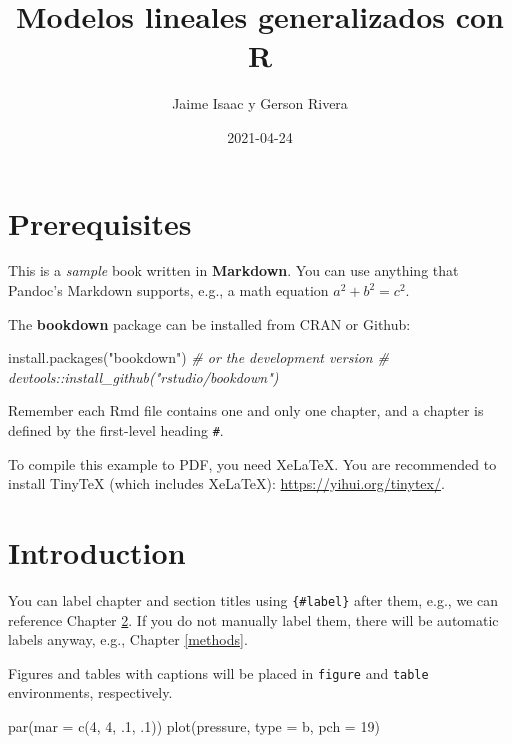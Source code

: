 \documentclass[
]{book}
\title{Modelos lineales generalizados con R}
\author{Jaime Isaac y Gerson Rivera}
\date{2021-04-24}
\newenvironment{Shaded}{\begin{snugshade}}{\end{snugshade}}
\newcommand{\AttributeTok}[1]{\textcolor[rgb]{0.77,0.63,0.00}{#1}}
\newcommand{\CommentTok}[1]{\textcolor[rgb]{0.56,0.35,0.01}{\textit{#1}}}
\newcommand{\DecValTok}[1]{\textcolor[rgb]{0.00,0.00,0.81}{#1}}
\newcommand{\FunctionTok}[1]{\textcolor[rgb]{0.00,0.00,0.00}{#1}}
\newcommand{\NormalTok}[1]{#1}
\newcommand{\StringTok}[1]{\textcolor[rgb]{0.31,0.60,0.02}{#1}}
\begin{document}
\maketitle

{
\setcounter{tocdepth}{1}
\tableofcontents
}
\hypertarget{prerequisites}{%
\chapter{Prerequisites}\label{prerequisites}}

This is a \emph{sample} book written in \textbf{Markdown}. You can use anything that Pandoc's Markdown supports, e.g., a math equation \(a^2 + b^2 = c^2\).

The \textbf{bookdown} package can be installed from CRAN or Github:

\begin{Shaded}
\begin{Highlighting}[]
\FunctionTok{install.packages}\NormalTok{(}\StringTok{"bookdown"}\NormalTok{)}
\CommentTok{\# or the development version}
\CommentTok{\# devtools::install\_github("rstudio/bookdown")}
\end{Highlighting}
\end{Shaded}

Remember each Rmd file contains one and only one chapter, and a chapter is defined by the first-level heading \texttt{\#}.

To compile this example to PDF, you need XeLaTeX. You are recommended to install TinyTeX (which includes XeLaTeX): \url{https://yihui.org/tinytex/}.

\hypertarget{intro}{%
\chapter{Introduction}\label{intro}}

You can label chapter and section titles using \texttt{\{\#label\}} after them, e.g., we can reference Chapter \ref{intro}. If you do not manually label them, there will be automatic labels anyway, e.g., Chapter \ref{methods}.

Figures and tables with captions will be placed in \texttt{figure} and \texttt{table} environments, respectively.

\begin{Shaded}
\begin{Highlighting}[]
\FunctionTok{par}\NormalTok{(}\AttributeTok{mar =} \FunctionTok{c}\NormalTok{(}\DecValTok{4}\NormalTok{, }\DecValTok{4}\NormalTok{, .}\DecValTok{1}\NormalTok{, .}\DecValTok{1}\NormalTok{))}
\FunctionTok{plot}\NormalTok{(pressure, }\AttributeTok{type =} \StringTok{\textquotesingle{}b\textquotesingle{}}\NormalTok{, }\AttributeTok{pch =} \DecValTok{19}\NormalTok{)}
\end{Highlighting}
\end{Shaded}
\end{document}
